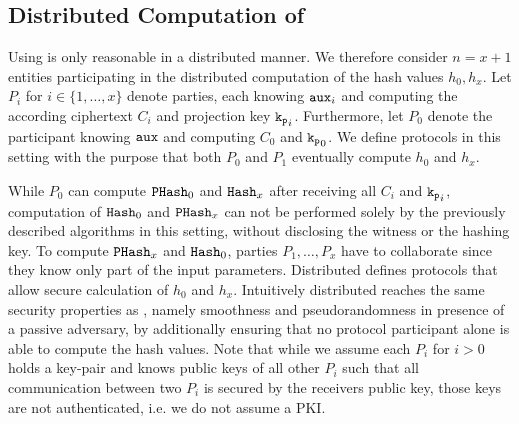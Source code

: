 \subsection[Distributed Computation of SPHFx]{Distributed Computation of \SPHFF}\label{sec:dsphf}
Using \SPHFF is only reasonable in a distributed manner.
We therefore consider $n=x+1$ entities participating in the distributed computation of the \SPHFF hash values $h_0,h_x$.
Let $P_i$ for $i\in\{1,\dots,x\}$ denote parties, each knowing $\mathtt{aux}_i$ and computing the according ciphertext $C_i$ and projection key $\mathtt{k_p}_i$.
Furthermore, let $P_0$ denote the participant knowing $\mathtt{aux}$ and computing $C_0$ and $\mathtt{k_p}_0$.
We define protocols in this setting with the purpose that both $P_0$ and $P_1$ eventually compute $h_0$ and $h_x$.

While $P_0$ can compute $\mathtt{PHash}_0$ and $\mathtt{Hash}_x$ after receiving all $C_i$ and $\mathtt{k_p}_i$, computation of $\mathtt{Hash}_0$ and $\mathtt{PHash}_x$ can not be performed solely by the previously described algorithms in this setting, without disclosing the witness or the hashing key.
To compute $\mathtt{PHash}_x$ and $\mathtt{Hash}_0$, parties $P_1,\dots,P_x$ have to collaborate since they know only part of the input parameters.
Distributed \SPHFF defines protocols that allow secure calculation of $h_0$ and $h_x$.
Intuitively distributed \SPHFF reaches the same security properties as \SPHFF, namely smoothness and pseudorandomness in presence of a passive adversary, by additionally ensuring that no protocol participant alone is able to compute the hash values.
Note that while we assume each $P_i$ for $i>0$ holds a key-pair and knows public keys of all other $P_i$ such that all communication between two $P_i$ is secured by the receivers public key, those keys are not authenticated, i.e. we do not assume a PKI.

